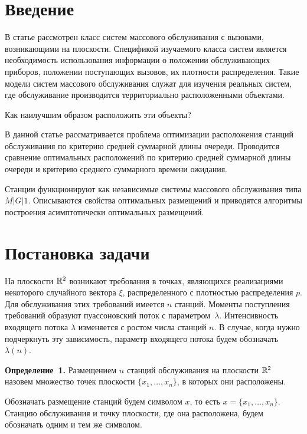       \begin{multicols}{2}

      \label{st\stat}

\section{Введение}

В статье рассмотрен класс систем массового обслуживания с вызовами, возникающими на 
плос\-кости.
Спецификой изучаемого класса систем является необходимость использования информации о
положении обслуживающих приборов, положении поступающих вызовов, их плотности распределения.
Такие модели систем массового обслуживания служат для изучения реальных систем, где
обслуживание производится территориально расположенными объектами.

Как наилучшим образом расположить эти объекты?

В данной статье рассматривается проблема оптимизации расположения станций обслуживания по
критерию средней суммарной длины очереди. Проводится сравнение оптимальных расположений по
критерию средней суммарной длины очереди и критерию среднего
суммарного времени ожидания.

Станции функционируют как независимые сис\-те\-мы массового обслуживания типа $M\vert G\vert 1$.
Описываются свойства оптимальных размещений и приводятся алгоритмы построения асимптотически
оптимальных размещений.

\section{Постановка задачи}

На плоскости $\mathbb{R}^2$ возникают
требования в точках, являющихся реализациями некоторого случайного
вектора $\xi$, распределенного с плотностью распределения $p$. Для
обслуживания этих требований имеется $n$ станций. Моменты
поступления требований образуют пуассоновский поток с параметром~$\lambda$. 
Интенсивность входящего потока $\lambda$ изменяется с
ростом числа станций $n$. В случае, когда нужно подчеркнуть эту
зависимость, параметр входящего потока будем обозначать~$\lambda(n)$.

\textbf{Определение~1.} Размещением $n$ станций обслуживания на плоскости $\mathbb{R}^2$ назовем
множество точек плоскости $\{x_1,\ldots,x_n\}$, в которых они расположены.

Обозначать размещение станций будем символом $x$, то есть $x=\{x_1,\ldots,x_n\}$. Станцию
обслуживания и точку плоскости, где она расположена, будем обозначать одним и тем же символом.


\end{multicols}
